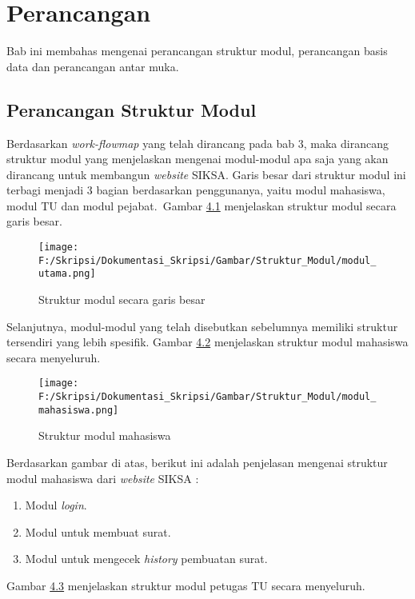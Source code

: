 \chapter{Perancangan}
\label{chap:perancangan}
Bab ini membahas mengenai perancangan struktur modul, perancangan basis data dan perancangan antar muka.

\section{Perancangan Struktur Modul}
\label{sec:perancangan_struktur_modul}
Berdasarkan \textit{work-flowmap} yang telah dirancang pada bab 3, maka dirancang struktur modul yang menjelaskan mengenai modul-modul apa saja yang akan dirancang untuk membangun \textit{website} SIKSA. Garis besar dari struktur modul ini terbagi menjadi 3 bagian berdasarkan penggunanya, yaitu modul mahasiswa, modul TU dan modul pejabat.\
Gambar \hyperlink{struktur_modul_garis_besar}{4.1} menjelaskan struktur modul secara garis besar.

\begin{figure}[H]
	\centering
		\texttt{[image: F:/Skripsi/Dokumentasi\_Skripsi/Gambar/Struktur\_Modul/modul\_utama.png]}
	\caption{Struktur modul secara garis besar}
	\label{fig:struktur_modul_garis_besar}
\end{figure}

Selanjutnya, modul-modul yang telah disebutkan sebelumnya memiliki struktur tersendiri yang lebih spesifik. Gambar \hyperlink{struktur_modul_mahasiswa}{4.2} menjelaskan struktur modul mahasiswa secara menyeluruh.

\begin{figure}[H]
	\centering
		\texttt{[image: F:/Skripsi/Dokumentasi\_Skripsi/Gambar/Struktur\_Modul/modul\_mahasiswa.png]}
	\caption{Struktur modul mahasiswa}
	\label{fig:struktur_modul_mahasiswa}
\end{figure}

Berdasarkan gambar di atas, berikut ini adalah penjelasan mengenai struktur modul mahasiswa dari \textit{website} SIKSA :
\begin{enumerate}
	\item Modul \textit{login}.
	\item Modul untuk membuat surat.
	\item Modul untuk mengecek \textit{history} pembuatan surat.
\end{enumerate}

Gambar \hyperlink{struktur_modul_tu}{4.3} menjelaskan struktur modul petugas TU secara menyeluruh.

